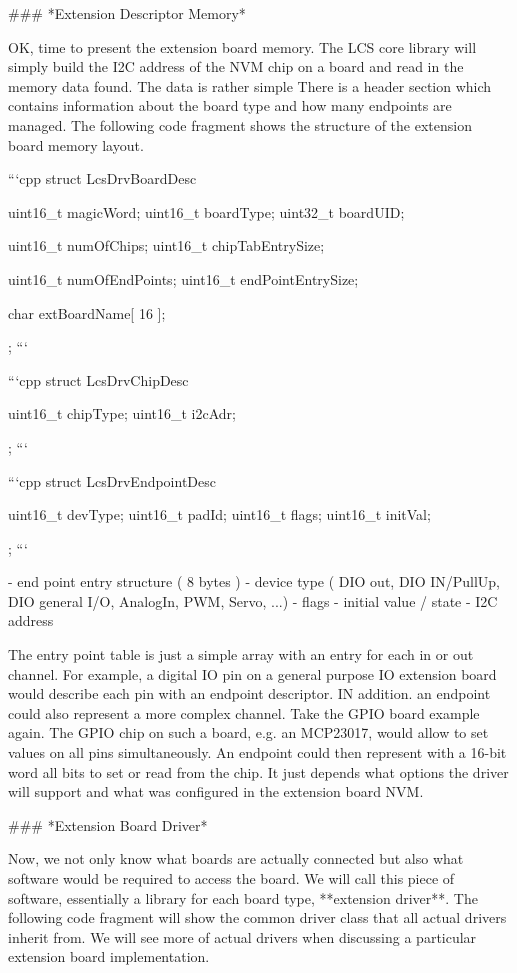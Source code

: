 ### *Extension Descriptor Memory*

OK, time to present the extension board memory. The LCS core library will simply build the I2C address of the NVM chip on a board and read in the memory data found. The data is rather simple There is a header section which contains information about the board type and how many endpoints are managed. The following code fragment shows the structure of the extension board memory layout.

```cpp
   struct LcsDrvBoardDesc {

      uint16_t  magicWord;
      uint16_t  boardType;
      uint32_t  boardUID;

      uint16_t  numOfChips;
      uint16_t  chipTabEntrySize;

      uint16_t  numOfEndPoints;
      uint16_t  endPointEntrySize;

      char      extBoardName[ 16 ];
    };
```

```cpp
   struct LcsDrvChipDesc {

     uint16_t chipType;
     uint16_t i2cAdr;
   };
```

```cpp
   struct LcsDrvEndpointDesc {

       uint16_t devType;
       uint16_t padId;
       uint16_t flags;
       uint16_t initVal;
   };
```


  - end point entry structure ( 8 bytes )
	- device type ( DIO out, DIO IN/PullUp, DIO general I/O,  AnalogIn, PWM, Servo, ...)
	- flags
	- initial value / state
	- I2C address

The entry point table is just a simple array with an entry for each in or out channel. For example, a digital IO pin on a general purpose IO extension board would describe each pin with an endpoint descriptor. IN addition. an endpoint could also represent a more complex channel. Take the GPIO board example again. The GPIO chip on such a board, e.g. an MCP23017, would allow to set values on all pins simultaneously. An endpoint could then represent with a 16-bit word all bits to set or read from the chip. It just depends what options the driver will support and what was configured in the extension board NVM.

### *Extension Board Driver*

Now, we not only know what boards are actually connected but also what software would be required to access the board. We will call this piece of software, essentially a library for each board type, **extension driver**. The following code fragment will show the common driver class that all actual drivers inherit from. We will see more of actual drivers when discussing a particular extension board implementation.

